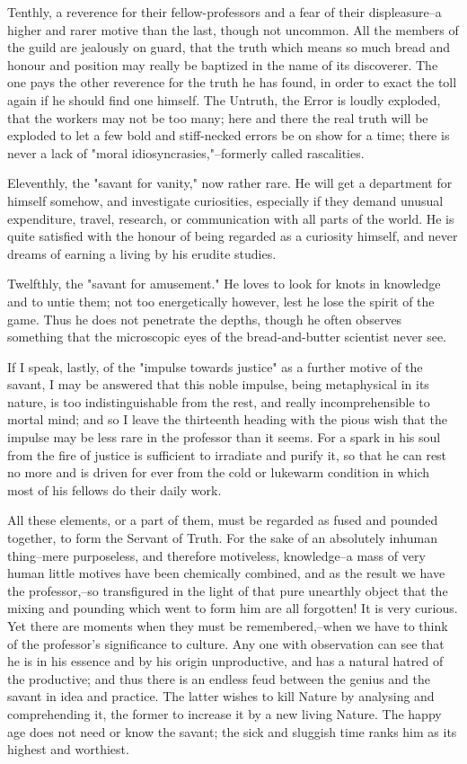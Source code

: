 Tenthly, a reverence for their fellow-professors and a fear of their
displeasure--a higher and rarer motive than the last, though not
uncommon. All the members of the guild are jealously on guard, that
the truth which means so much bread and honour and position may
really be baptized in the name of its discoverer. The one pays the
other reverence for the truth he has found, in order to exact the
toll again if he should find one himself. The Untruth, the Error is
loudly exploded, that the workers may not be too many; here and there
the real truth will be exploded to let a few bold and stiff-necked
errors be on show for a time; there is never a lack of "moral
idiosyncrasies,"--formerly called rascalities.

Eleventhly, the "savant for vanity," now rather rare. He will get a
department for himself somehow, and investigate curiosities,
especially if they demand unusual expenditure, travel, research, or
communication with all parts of the world. He is quite satisfied with
the honour of being regarded as a curiosity himself, and never dreams
of earning a living by his erudite studies.

Twelfthly, the "savant for amusement." He loves to look for knots in
knowledge and to untie them; not too energetically however, lest he
lose the spirit of the game. Thus he does not penetrate the depths,
though he often observes something that the microscopic eyes of the
bread-and-butter scientist never see.

If I speak, lastly, of the "impulse towards justice" as a further
motive of the savant, I may be answered that this noble impulse,
being metaphysical in its nature, is too indistinguishable from the
rest, and really incomprehensible to mortal mind; and so I leave the
thirteenth heading with the pious wish that the impulse may be less
rare in the professor than it seems. For a spark in his soul from the
fire of justice is sufficient to irradiate and purify it, so that he
can rest no more and is driven for ever from the cold or lukewarm
condition in which most of his fellows do their daily work.

All these elements, or a part of them, must be regarded as fused and
pounded together, to form the Servant of Truth. For the sake of an
absolutely inhuman thing--mere purposeless, and therefore motiveless,
knowledge--a mass of very human little motives have been chemically
combined, and as the result we have the professor,--so transfigured
in the light of that pure unearthly object that the mixing and
pounding which went to form him are all forgotten! It is very
curious. Yet there are moments when they must be remembered,--when we
have to think of the professor's significance to culture. Any one
with observation can see that he is in his essence and by his origin
unproductive, and has a natural hatred of the productive; and thus
there is an endless feud between the genius and the savant in idea
and practice. The latter wishes to kill Nature by analysing and
comprehending it, the former to increase it by a new living Nature.
The happy age does not need or know the savant; the sick and sluggish
time ranks him as its highest and worthiest.

